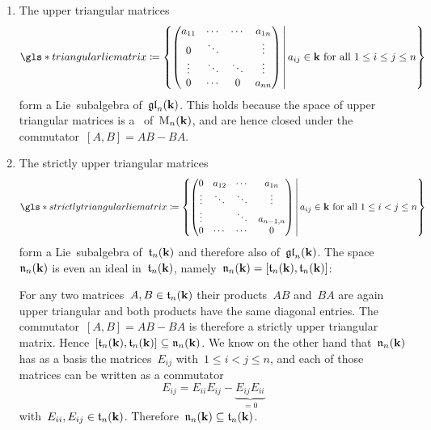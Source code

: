 \begin{examples}
\begin{enumerate}
  \item
    The upper triangular matrices
    \[
      \gls*{triangular lie matrix}
      \defined
      \left\{
        \begin{pmatrix}
            a_{11}
          & \cdots
          & \cdots
          & a_{1n}
          \\
            0
          & \ddots
          & {}
          & \vdots
          \\
            \vdots
          & \ddots
          & \ddots
          & \vdots
          \\
            0
          & \cdots
          & 0
          & a_{nn}
        \end{pmatrix}
      \suchthat*
        \text{$a_{ij} \in \kf$ for all~$1 \leq i \leq j \leq n$}
      \right\}
    \]
    form a Lie~subalgebra of~$\mathfrak{gl}_n(\mathbf{k})$.
    This holds because the space of upper triangular matrices is a~{\subalgebra{$\kf$}} of~$\operatorname{M}_n(\mathbf{k})$, and are hence closed under the commutator~$[A,B] = AB - BA$.
   
  \item
    The strictly upper triangular matrices
    \[
      \gls*{strictly triangular lie matrix}
      \defined
      \left\{
        \begin{pmatrix}
            0
          & a_{12}
          & \cdots
          & a_{1n}
          \\
            \vdots
          & \ddots
          & \ddots
          & \vdots
          \\
            \vdots
          & {}
          & \ddots
          & a_{n-1,n}
          \\
            0
          & \cdots
          & \cdots
          & 0
        \end{pmatrix}
      \suchthat*
        \text{$a_{ij} \in \kf$ for all~$1 \leq i < j \leq n$}
      \right\}
    \]
    form a Lie~subalgebra of~$\mathfrak{t}_n(\mathbf{k})$ and therefore also of~$\mathfrak{gl}_n(\mathbf{k})$.
    The space~$\mathfrak{n}_n(\mathbf{k})$ is even an ideal in~$\mathfrak{t}_n(\mathbf{k})$, namely~$\mathfrak{n}_n(\mathbf{k}) = [\mathfrak{t}_n(\mathbf{k}), \mathfrak{t}_n(\mathbf{k})]$:
   
    For any two matrices~$A, B \in \mathfrak{t}_n(\mathbf{k})$ their products~$AB$ and~$BA$ are again upper triangular and both products have the same diagonal entries.
    The commutator~$[A,B] = AB - BA$ is therefore a strictly upper triangular matrix.
    Hence~$[\mathfrak{t}_n(\mathbf{k}), \mathfrak{t}_n(\mathbf{k})] \subseteq \mathfrak{n}_n(\mathbf{k})$.
    We know on the other hand that~$\mathfrak{n}_n(\mathbf{k})$ has as a basis the matrices~$E_{ij}$ with~$1 \leq i < j \leq n$, and each of those matrices can be written as a commutator
    \[
      E_{ij}
      =
      E_{ii} E_{ij} - \underbrace{ E_{ij} E_{ii} }_{= 0}
    \]
    with~$E_{ii}, E_{ij} \in \mathfrak{t}_n(\mathbf{k})$.
    Therefore~$\mathfrak{n}_n(\mathbf{k}) \subseteq \mathfrak{t}_n(\mathbf{k})$.
  \end{enumerate}
\end{examples}


